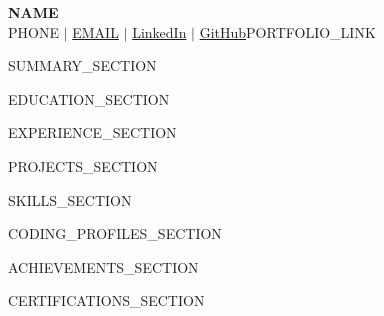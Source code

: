 \documentclass[a4paper,10pt]{article}
\begin{document}
\begin{center}
  {\textbf{\Huge {{NAME}}}}\\[5pt]
  \small
  {{PHONE}} $|$
  \href{mailto:{{EMAIL}}}{{{EMAIL}}} $|$
  \href{{{LINKEDIN}}}{LinkedIn} $|$
  \href{{{GITHUB}}}{GitHub}{{PORTFOLIO_LINK}}
\end{center}

\vspace{-2pt}

{{SUMMARY_SECTION}}

{{EDUCATION_SECTION}}

{{EXPERIENCE_SECTION}}

{{PROJECTS_SECTION}}

{{SKILLS_SECTION}}

{{CODING_PROFILES_SECTION}}

{{ACHIEVEMENTS_SECTION}}

{{CERTIFICATIONS_SECTION}}
\end{document}
